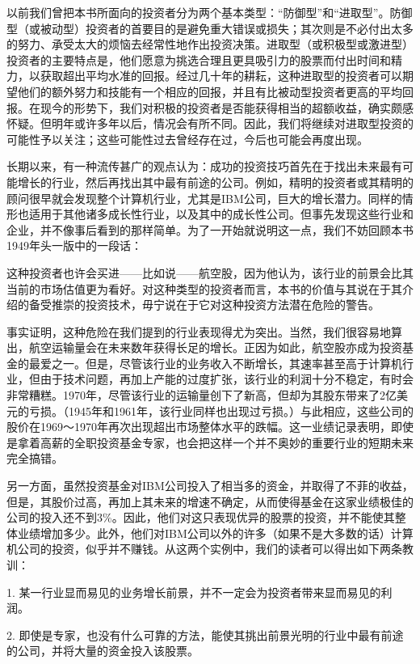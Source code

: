 \documentclass[12pt,oneside]{book}
\begin{document}
以前我们曾把本书所面向的投资者分为两个基本类型：“防御型”和“进取型”。防御型（或被动型）投资者的首要目的是避免重大错误或损失；其次则是不必付出太多的努力、承受太大的烦恼去经常性地作出投资决策。进取型（或积极型或激进型）投资者的主要特点是，他们愿意为挑选合理且更具吸引力的股票而付出时间和精力，以获取超出平均水准的回报。经过几十年的耕耘，这种进取型的投资者可以期望他们的额外努力和技能有一个相应的回报，并且有比被动型投资者更高的平均回报。在现今的形势下，我们对积极的投资者是否能获得相当的超额收益，确实颇感怀疑。但明年或许多年以后，情况会有所不同。因此，我们将继续对进取型投资的可能性予以关注；这些可能性过去曾经存在过，今后也可能会再度出现。

长期以来，有一种流传甚广的观点认为：成功的投资技巧首先在于找出未来最有可能增长的行业，然后再找出其中最有前途的公司。例如，精明的投资者或其精明的顾问很早就会发现整个计算机行业，尤其是IBM公司，巨大的增长潜力。同样的情形也适用于其他诸多成长性行业，以及其中的成长性公司。但事先发现这些行业和企业，并不像事后看到的那样简单。为了一开始就说明这一点，我们不妨回顾本书1949年头一版中的一段话：

这种投资者也许会买进——比如说——航空股，因为他认为，该行业的前景会比其当前的市场估值更为看好。对这种类型的投资者而言，本书的价值与其说在于其介绍的备受推崇的投资技术，毋宁说在于它对这种投资方法潜在危险的警告。

事实证明，这种危险在我们提到的行业表现得尤为突出。当然，我们很容易地算出，航空运输量会在未来数年获得长足的增长。正因为如此，航空股亦成为投资基金的最爱之一。但是，尽管该行业的业务收入不断增长，其速率甚至高于计算机行业，但由于技术问题，再加上产能的过度扩张，该行业的利润十分不稳定，有时会非常糟糕。1970年，尽管该行业的运输量创下了新高，但却为其股东带来了2亿美元的亏损。（1945年和1961年，该行业同样也出现过亏损。）与此相应，这些公司的股价在1969～1970年再次出现超出市场整体水平的跌幅。这一业绩记录表明，即使是拿着高薪的全职投资基金专家，也会把这样一个并不奥妙的重要行业的短期未来完全搞错。

另一方面，虽然投资基金对IBM公司投入了相当多的资金，并取得了不菲的收益，但是，其股价过高，再加上其未来的增速不确定，从而使得基金在这家业绩极佳的公司的投入还不到3\%。因此，他们对这只表现优异的股票的投资，并不能使其整体业绩增加多少。此外，他们对IBM公司以外的许多（如果不是大多数的话）计算机公司的投资，似乎并不赚钱。从这两个实例中，我们的读者可以得出如下两条教训：

1. 某一行业显而易见的业务增长前景，并不一定会为投资者带来显而易见的利润。

2. 即使是专家，也没有什么可靠的方法，能使其挑出前景光明的行业中最有前途的公司，并将大量的资金投入该股票。
\end{document}
